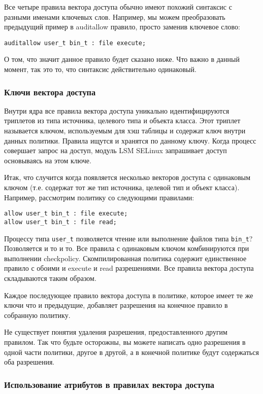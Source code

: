 \documentclass{./../class/UIR}
\begin{document}
	Все четыре правила вектора доступа обычно имеют похожий синтаксис с разными
	именами ключевых слов. Например, мы можем преобразовать предыдущий пример в
	auditallow правило, просто заменив ключевое слово:
\begin{verbatim}
auditallow user_t bin_t : file execute;
\end{verbatim}
	О том, что значит данное правило будет сказано ниже. Что важно в данный момент,
	так  это то, что синтаксис действительно одинаковый.

\subsubsection{Ключи вектора доступа}

	Внутри ядра все правила вектора доступа уникально идентифицируются триплетов из
	типа источника, целевого типа и объекта класса. Этот триплет называется ключом,
	используемым для хэш таблицы и содержат ключ внутри данных политики. Правила
	ищутся и хранятся по данному ключу. Когда процесс совершает запрос на доступ,
	модуль LSM SELinux запрашивает доступ основываясь на этом ключе.

	Итак, что случится когда появляется несколько векторов доступа с одинаковым
	ключом (т.е. содержат тот же тип источника, целевой тип и объект класса).
	Например, рассмотрим политику со следующими правилами:

\begin{verbatim}
allow user_t bin_t : file execute;
allow user_t bin_t : file read;
\end{verbatim}

	Процессу типа \verb"user_t" позволяется чтение или выполнение файлов типа
	\verb"bin_t"? Позволяется и то и то. Все правила с одинаковым ключом
	комбинируются при выполнении checkpolicy. Скомпилированная политика содержит
	единственное правило с обоими и execute и read разрешениями. Все правила
	вектора доступа складываются таким образом.

	Каждое последующее правило вектора доступа в политике, которое имеет те же
	ключи что и предыдущие, добавляет разрешения на конечное правило в собранную
	политику.

	Не существует понятия удаления разрешения, предоставленного другим правилом.
	Так что будьте осторожны, вы можете написать одно разрешения в одной части
	политики, другое в другой, а в конечной политике будут содержаться оба
	разрешения.

\subsubsection{Использование атрибутов в правилах вектора доступа}
\end{document}
